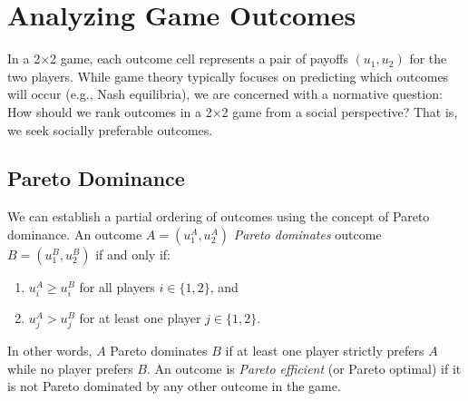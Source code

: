 \documentclass[11pt]{amsart}
\begin{document}


\section{Analyzing Game Outcomes}

In a 2×2 game, each outcome cell represents a pair of payoffs $(u_1, u_2)$ for the two players. While game theory typically focuses on predicting which outcomes will occur (e.g., Nash equilibria), we are concerned with a normative question: How should we rank outcomes in a 2×2 game from a social perspective? That is, we seek socially preferable outcomes.

\subsection{Pareto Dominance}

We can establish a partial ordering of outcomes using the concept of Pareto dominance. An outcome $A = (u_1^A, u_2^A)$ \textit{Pareto dominates} outcome $B = (u_1^B, u_2^B)$ if and only if:

\begin{enumerate}
    \item $u_i^A \geq u_i^B$ for all players $i \in \{1, 2\}$, and
    \item $u_j^A > u_j^B$ for at least one player $j \in \{1, 2\}$.
\end{enumerate}

In other words, $A$ Pareto dominates $B$ if at least one player strictly prefers $A$ while no player prefers $B$. An outcome is \textit{Pareto efficient} (or Pareto optimal) if it is not Pareto dominated by any other outcome in the game.
\end{document}
